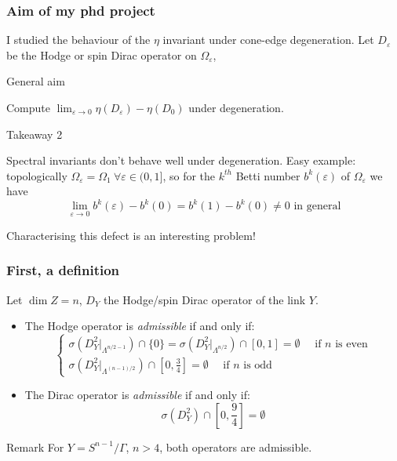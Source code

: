 \documentclass{beamer}
\newcommand{\ve}{\varepsilon}
\newcommand{\rel}[1]{|_{#1}}
\begin{document}
\begin{frame}
\frametitle{Aim of my phd project}
I studied the behaviour of the $\eta$ invariant under cone-edge degeneration. Let $D_\varepsilon$ be the Hodge or spin Dirac operator on $\Omega_\varepsilon$,

\begin{block}{\begin{center}General aim\end{center}}
\begin{center}
Compute $\lim_{\ve\to0} \eta(D_\ve)-\eta(D_0)$ under degeneration.
\end{center}
\end{block}

\begin{alertblock}{\begin{center}Takeaway 2\end{center}}
\parbox{\linewidth}{
Spectral invariants don't behave well under degeneration. Easy example: topologically $\Omega_\ve=\Omega_1\ \forall \ve\in (0,1]$, so for the $k^{th}$ Betti number $b^k(\ve)$ of $\Omega_\ve$ we have
\[\lim_{\ve\to 0}b^k(\ve)- b^k(0)=b^k(1)-b^k(0)\neq 0\text{ in general}\]}
Characterising this defect is an interesting problem!
\end{alertblock}

\end{frame}


\begin{frame}
\frametitle{First, a definition}
\begin{definition}
Let $\dim Z=n$, $D_Y$ the Hodge/spin Dirac operator of the link $Y$.
\begin{itemize}
\item The Hodge operator is \emph{admissible} if and only if:
\[
\begin{cases}
\sigma(D^2_Y\rel{\Lambda^{{n}/2-1}})\cap \{0\}=\sigma(D^2_Y\rel{\Lambda^{n/2}})\cap\left[0,1\right]=\emptyset\quad\text{ if $n$ is even}\\
\sigma(D^2_Y\rel{\Lambda^{(n-1)/2}})\cap\left[0,\frac{3}{4}\right]=\emptyset\quad\text{ if $n$ is odd}
\end{cases}
\]
\item The Dirac operator is \emph{admissible} if and only if:
\[
\sigma(D^2_Y)\cap \left[0,\frac{9}{4}\right]=\emptyset
\]
\end{itemize}
\end{definition}
\begin{exampleblock}{Remark}
\justifying
For $Y=S^{n-1}/\Gamma$, $n>4$, both operators are admissible.
\end{exampleblock}
\end{frame}
\end{document}
